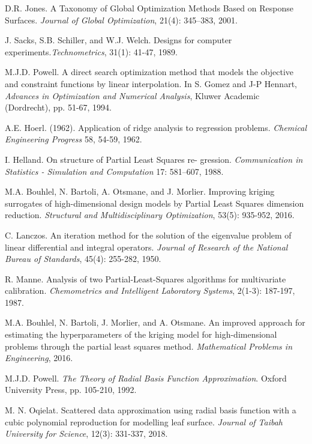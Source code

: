 \documentclass[twoside, 12pt,notitlepage]{report}
\begin{document}
\begin{thebibliography}{9}
D.R. Jones. A Taxonomy of Global Optimization Methods Based on
Response Surfaces. \textit{Journal of Global Optimization}, 21(4): 
345–383, 2001.

J. Sacks, S.B. Schiller, and W.J. Welch. Designs for 
computer experiments.\textit{Technometrics}, 
31(1): 41-47, 1989.

M.J.D. Powell. A direct search optimization method that 
models the objective and constraint functions by linear 
interpolation. In S. Gomez and J-P Hennart, 
\textit{Advances in Optimization and Numerical Analysis},
Kluwer Academic (Dordrecht), pp. 51-67, 1994.

A.E. Hoerl. (1962). Application of ridge analysis to regression 
problems. \textit{Chemical Engineering Progress} 58, 54-59, 1962.

I. Helland. On structure of Partial Least Squares re-
gression. \textit{Communication in Statistics - Simulation 
and Computation} 17: 581–607, 1988.

M.A. Bouhlel, N. Bartoli, A. Otsmane, and J. Morlier. 
Improving kriging surrogates of high-dimensional design 
models by Partial Least Squares dimension reduction. 
\textit{Structural and Multidisciplinary Optimization}, 
53(5): 935-952, 2016.

C. Lanczos.  An iteration method for the solution of
the eigenvalue problem of linear differential and integral
operators. \textit{Journal of Research of the National 
Bureau of Standards}, 45(4): 255-282, 1950.

R. Manne.  Analysis of two Partial-Least-Squares 
algorithms for multivariate calibration. 
\textit{Chemometrics and Intelligent Laboratory Systems}, 
2(1-3): 187-197, 1987. 

M.A. Bouhlel, N. Bartoli, J. Morlier, and A. Otsmane. An 
improved approach for estimating the hyperparameters of 
the kriging model for high-dimensional problems through 
the partial least squares method. \textit{Mathematical 
Problems in Engineering}, 2016.

M.J.D. Powell. \textit{The Theory of Radial Basis Function 
Approximation}. Oxford University Press, pp. 105-210, 1992.

M. N. Oqielat. Scattered data approximation using radial 
basis function with a cubic polynomial reproduction for 
modelling leaf surface. \textit{Journal of Taibah 
University for Science}, 12(3): 331-337, 2018.  


\end{thebibliography}
\end{document}
